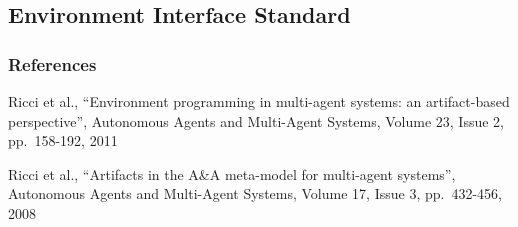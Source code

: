 \subsection{Environment Interface Standard}


\subsubsection*{References}

Ricci et al., ``Environment programming in multi-agent systems: an
artifact-based perspective'', Autonomous Agents and Multi-Agent Systems,
Volume 23, Issue 2, pp.\ 158-192, 2011

Ricci et al., ``Artifacts in the A\&A meta-model for multi-agent
systems'', Autonomous Agents and Multi-Agent Systems, Volume 17,
Issue 3, pp.\ 432-456, 2008

